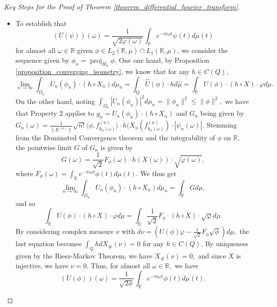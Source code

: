 \documentclass{amsart}
\theoremstyle{definition}
\theoremstyle{remark}
\def \Proj{\operatorname{proj}}
\def \HMU{\hat{\mu}}
\def \HU{\hat{U}}
\def \LL{\langle}
\def \RR{\rangle}
\begin{document}
\begin{proof}[Key Steps for the Proof of Theorem \ref{theorem_differential_fourier_transform}]
\begin{itemize}
		\item To establish that $$(U(\psi))(\omega)=\frac{1}{\sqrt{2\varphi(\omega)}}\int_{\mathbb{R}}e^{-\pi i \omega t} \psi(t)d\mu(t)$$ for almost all $\omega\in \mathbb{R}$ given $\phi\in L_2(\mathbb{R},\mu)\cap L_1(\mathbb{R},\mu)$, we consider the sequence given by $\phi_n=\Proj_{H_n}\phi.$ One one hand, by Proposition \ref{proposition_converging_isometry}, we know that for any $h\in C(Q),$ $$\lim_{n\rightarrow\infty}\int_{\Omega_n} U_n(\phi_n)\cdot (h\circ X_n)d\mu_n=\int_{Q}\HU(\phi)\cdot hd\HMU=\int_{\mathbb{R}}U(\phi)\cdot (h\circ X)\cdot\varphi d\mu.$$ On the other hand, noting $\int_{\Omega_n}|U_n(\phi_n)|^2d\mu_n=\|\phi_n\|^2\leq \|\phi\|^2,$ we have that Property 2 applies to $g_n=U_n(\phi_n)\cdot(h\circ X_n)$ and $G_n$ being given by $G_n(\omega)=\frac{1}{\|E^{(n)}\|}\sqrt{n!}\LL \phi, f_{k_n(\omega)}^{(n)}\RR\cdot h(X_n(f_{k_n(\omega)}^{(n)})\cdot|\psi_n(\omega)|.$ Stemming from the Dominated Convergence theorem and the integrability of $\phi$ on $\mathbb{R}$, the pointwise limit $G$ of $G_n$ is given by $$G(\omega)=\frac{1}{\sqrt{2}}F_{\phi}(\omega)\cdot h(X(\omega))\cdot\sqrt{\varphi(\omega)},$$ where $F_{\phi}(\omega)=\int_{\mathbb{R}}e^{-\pi i \omega t}\phi(t)d\mu(t).$ We thus get $$\lim_{n\rightarrow\infty}\int_{\Omega_n} U_n(\phi_n)\cdot (h\circ X_n)d\mu_n=\int_{\mathbb{R}}Gd\mu,$$ and so $$\int_{\mathbb{R}}U(\phi)\cdot (h\circ X)\cdot\varphi d\mu=\int_{\mathbb{R}}\frac{1}{\sqrt{2}}F_{\phi}\cdot (h\circ X)\cdot \sqrt{\varphi}d\mu.$$ By considering complex measure $\nu$ with $d\nu=(U(\phi)\varphi-\frac{1}{\sqrt{2}}F_{\phi}\sqrt{\phi})d\mu,$ the last equation becomes $\int_Qh dX_{\#}(\nu)=0$ for any $h\in C(Q).$ By uniqueness given by the Riesz-Markov Theorem, we have $X_{\#}(\nu)=0,$ and since $X$ is injective, we have $\nu=0.$ Thus, for almost all $\omega\in\mathbb{R},$ we have $$(U(\phi))(\omega)=\frac{1}{\sqrt{2\phi}}\int_{\mathbb{R}}e^{-\pi i \omega t}\phi(t)d\mu(t).$$

\end{itemize}
\end{proof}
\end{document}
